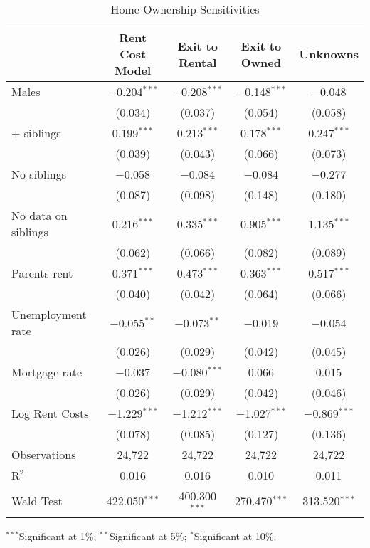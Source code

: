 
\begin{table}[!htbp] \centering 
  \begin{threeparttable}
  \caption{Home Ownership Sensitivities} 
  \label{exit_res} 
\begin{tabular}{@{\extracolsep{1pt}}lcccc} 
\toprule
\parbox[t]{0.22\textwidth}{\centering } & \parbox[t]{0.15\textwidth}{\centering Rent Cost Model} & \parbox[t]{0.15\textwidth}{\centering Exit to Rental} & \parbox[t]{0.15\textwidth}{\centering Exit to Owned} & \parbox[t]{0.15\textwidth}{\centering Unknowns} \\
\midrule
 Males & $-$0.204$^{***}$ & $-$0.208$^{***}$ & $-$0.148$^{***}$ & $-$0.048 \\ 
  & (0.034) & (0.037) & (0.054) & (0.058) \\ 
+ siblings & 0.199$^{***}$ & 0.213$^{***}$ & 0.178$^{***}$ & 0.247$^{***}$ \\ 
  & (0.039) & (0.043) & (0.066) & (0.073) \\ 
\addlinespace[0.5em]
 No siblings & $-$0.058 & $-$0.084 & $-$0.084 & $-$0.277 \\ 
  & (0.087) & (0.098) & (0.148) & (0.180) \\ 
\addlinespace[0.5em]
 No data on siblings & 0.216$^{***}$ & 0.335$^{***}$ & 0.905$^{***}$ & 1.135$^{***}$ \\ 
  & (0.062) & (0.066) & (0.082) & (0.089) \\ 
\addlinespace[0.5em]
 Parents rent & 0.371$^{***}$ & 0.473$^{***}$ & 0.363$^{***}$ & 0.517$^{***}$ \\ 
  & (0.040) & (0.042) & (0.064) & (0.066) \\ 
\addlinespace[0.5em]
 Unemployment rate & $-$0.055$^{**}$ & $-$0.073$^{**}$ & $-$0.019 & $-$0.054 \\ 
  & (0.026) & (0.029) & (0.042) & (0.045) \\ 
\addlinespace[0.5em]
 Mortgage rate & $-$0.037 & $-$0.080$^{***}$ & 0.066 & 0.015 \\ 
  & (0.026) & (0.029) & (0.042) & (0.046) \\ 
\addlinespace[0.5em]
 Log Rent Costs & $-$1.229$^{***}$ & $-$1.212$^{***}$ & $-$1.027$^{***}$ & $-$0.869$^{***}$ \\ 
  & (0.078) & (0.085) & (0.127) & (0.136) \\ 
\addlinespace[0.5em]
Observations & 24,722 & 24,722 & 24,722 & 24,722 \\ 
R$^{2}$ & 0.016 & 0.016 & 0.010 & 0.011 \\ 
Wald Test & 422.050$^{***}$ & 400.300$^{***}$ & 270.470$^{***}$ & 313.520$^{***}$ \\ 
\bottomrule
\end{tabular} 
  \begin{tablenotes}[flushleft]
  \item $^{***}$Significant at 1\%; $^{**}$Significant at 5\%; $^{*}$Significant at 10\%.
  \end{tablenotes}
  \end{threeparttable}
\end{table} 
